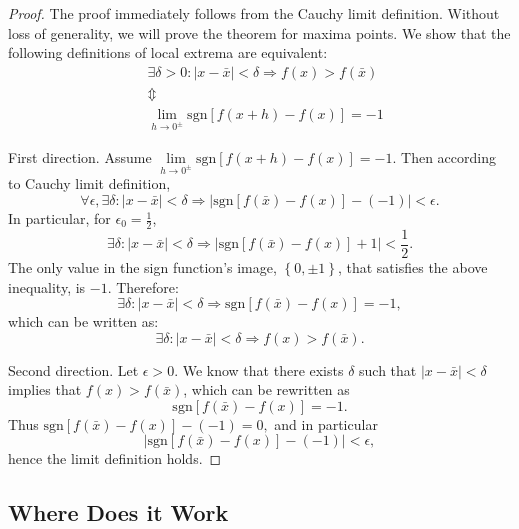 \documentclass[11pt]{book}
\begin{document}
\begin{proof}The proof immediately follows from the Cauchy limit definition. Without loss of generality, we will prove the theorem for maxima points. We show that the following definitions of local extrema are equivalent: $$\begin{array}{ccc}
& \exists\delta>0:\left|x-\bar{x}\right|<\delta\Longrightarrow f\left(x\right)>f\left(\bar{x}\right)\\
& \Updownarrow\\
& \underset{{\scriptscriptstyle h\rightarrow0^{\pm}}}{\lim}\text{sgn}\left[f\left(x+h\right)-f\left(x\right)\right]=-1
\end{array}$$

First direction. Assume $\underset{{\scriptscriptstyle h\rightarrow0^{\pm}}}{\lim}\text{sgn}\left[f \left(x+h\right)-f\left(x\right)\right]=-1.$ Then according to Cauchy limit definition,
$$\forall\epsilon,\exists\delta:\left|x-\bar{x}\right| < \delta\Longrightarrow\left|\text{sgn}\left[f\left(\bar{x}\right)-f\left(x\right)\right]-\left(-1\right)\right| < \epsilon.$$
In particular, for $\epsilon_{0}=\frac{1}{2}$, $$\exists\delta:\left|x-\bar{x}\right|<\delta\Longrightarrow\left|\text{sgn}\left[f\left(\bar{x}\right)-f\left(x\right)\right]+1\right|<\frac{1}{2}.$$
The only value in the sign function’s image, $\left\{ 0,\pm1\right\}$, that satisfies the above inequality, is $-1$. Therefore:
$$\exists\delta:\left|x-\bar{x}\right|<\delta\Longrightarrow \text{sgn}\left[f\left(\bar{x}\right)-f\left(x\right)\right]=-1,$$
which can be written as:
$$\exists\delta:\left|x-\bar{x}\right|<\delta\Longrightarrow f\left(x\right)>f\left(\bar{x}\right).$$

Second direction. Let $\epsilon>0$. We know that there exists $\delta$ such that $\left|x-\bar{x}\right| < \delta$ implies that $f\left(x\right)>f\left(\bar{x}\right)$, which can be rewritten as $$\text{sgn}\left[f\left(\bar{x}\right)-f\left(x\right)\right]=-1.$$ Thus $\text{sgn}\left[f\left(\bar{x}\right)-f\left(x\right)\right]-\left(-1\right)=0,$ and in particular $$\left|\text{sgn}\left[f\left(\bar{x}\right)-f\left(x\right)\right]-\left(-1\right)\right|<\epsilon,$$hence the limit definition holds.

\end{proof}

\subsection{Where Does it Work}
\end{document}
